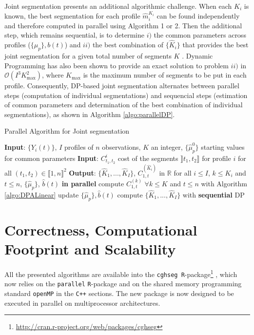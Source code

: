 \documentclass[11pt]{llncs}
\newcommand{\esoft}{\texttt{cghseg }}
\begin{document}
{Joint segmentation presents an additional algorithmic challenge. When each $K_i$ is known, the best segmentation for each profile $\widehat{m}_{i}^{K_i}$ can be found independently and therefore computed in parallel using Algorithm 1 or 2. Then the additional step, which remains sequential, is to determine $i)$ the common parameters across profiles ($\{\mu_p\}, b(t)$) and $ii)$ the best combination of $\{\widehat{K}_i\}$ that provides the best joint segmentation for a given total number of segments $K$ \cite{PLH11}. Dynamic Programming has also been shown to provide an exact solution to problem $ii)$ in $\mathcal{O}(I^3 K_{\max}^2)$, where $K_{\max}$ is the maximum number of segments to be put in each profile. Consequently, DP-based joint segmentation alternates between parallel steps (computation of individual segmentations) and sequencial steps (estimation of common parameters and determination of the best combination of individual segmentations), as shown in Algorithm \ref{algo:parallelDP}.
\begin{algorithm}
\begin{algorithmic}
\caption{Parallel Algorithm for Joint segmentation}\label{algo:parallelDP}
\State \textbf{Input}: $\{Y_i(t)\}$, $I$ profiles of $n$ observations, $K$ an integer, $\{\widehat{\mu}_p^0\}$ starting values for common parameters
\State \textbf{Input}: $C_{t_1,t_2}^i$ cost of the segments $\rrbracket t_1, t_2 \rrbracket$ for profile $i$ for all $(t_1, t_2) \in \llbracket1, n \rrbracket^2$
\State \textbf{Output}: $\{\widehat{K}_1,..., \widehat{K}_I\}$, $C^{(\widehat{K}_i)}_{1,t}$ in $\mathbb{R}$ for all $i \leq I$, $k \leq K_i$ and $t \leq n$, $\{\widehat{\mu}_p\}$, $\widehat{b}(t)$ 
 {\bf in parallel}
\State compute $C^{(k)}_{1,t}$  $\forall k \leq K$ and $t \leq n$ with Algorithm \ref{algo:DPALinear}
\EndFor
\State update $\{\widehat{\mu}_p\}, \widehat{b}(t)$
\State compute $\{\widehat{K}_1,..., \widehat{K}_I\}$ with {\bf sequential} DP \cite{PLH11}
\EndWhile
  \end{algorithmic}
\end{algorithm}

\section{Correctness, Computational Footprint and Scalability}

All the presented algorithms are available into the \esoft \texttt{R}-package\footnote{\url{http://cran.r-project.org/web/packages/cghseg}} , which now relies on the \texttt{parallel} \texttt{R}-package and on the shared memory programming standard \texttt{openMP} in the \texttt{C++} sections. The new package is now designed to be executed in parallel on multiprocessor architectures. 

}
\end{document}
